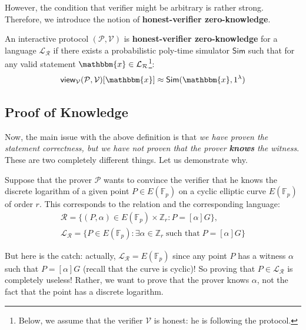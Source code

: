 \documentclass[../../book.tex]{subfiles}
\begin{document}
However, the condition that verifier might be arbitrary is rather strong.
Therefore, we introduce the notion of \textbf{honest-verifier zero-knowledge}.

\begin{definition}
    An interactive protocol $(\mathcal{P}, \mathcal{V})$ is
    \textbf{honest-verifier zero-knowledge} for a language
    $\mathcal{L}_{\mathcal{R}}$ if there exists a probabilistic poly-time
    simulator $\mathsf{Sim}$ such that for any valid statement $\mathbbm{x} \in
    \mathcal{L}_{\mathcal{R}}$\footnote{Below, we assume that the verifier
    $\mathcal{V}$ is honest: he is following the protocol.}:
    \begin{equation*}
        \mathsf{view}_{\mathcal{V}}(\mathcal{P}, \mathcal{V})[\mathbbm{x}] \approx \mathsf{Sim}(\mathbbm{x},1^{\lambda})
    \end{equation*}
\end{definition}

\subsection{Proof of Knowledge}

Now, the main issue with the above definition is that \textit{we have proven the
statement correctness, but we have not proven that the prover \textbf{knows} the
witness}. These are two completely different things. Let us demonstrate why.

\begin{example}
    Suppose that the prover $\mathcal{P}$ wants to convince the verifier that he
    knows the discrete logarithm of a given point $P \in E(\mathbb{F}_p)$ on a
    cyclic elliptic curve $E(\mathbb{F}_p)$ of order $r$. This corresponds to
    the relation and the corresponding language:
    \begin{align*}
        \mathcal{R} = \{(P, \alpha) \in E(\mathbb{F}_p) \times \mathbb{Z}_r: P = [\alpha] G\}, \\ \mathcal{L}_{\mathcal{R}} = \{P \in E(\mathbb{F}_p): \exists \alpha \in \mathbb{Z}_r \; \text{such that} \; P = [\alpha] G\}
    \end{align*}

    But here is the catch: actually, $\mathcal{L}_{\mathcal{R}} =
    E(\mathbb{F}_p)$ since any point $P$ has a witness $\alpha$ such that $P =
    [\alpha] G$ (recall that the curve is cyclic)! So proving that $P \in
    \mathcal{L}_{\mathcal{R}}$ is completely useless! Rather, we want to prove
    that the prover knows $\alpha$, not the fact that the point has a discrete
    logarithm.
\end{example}
\end{document}
